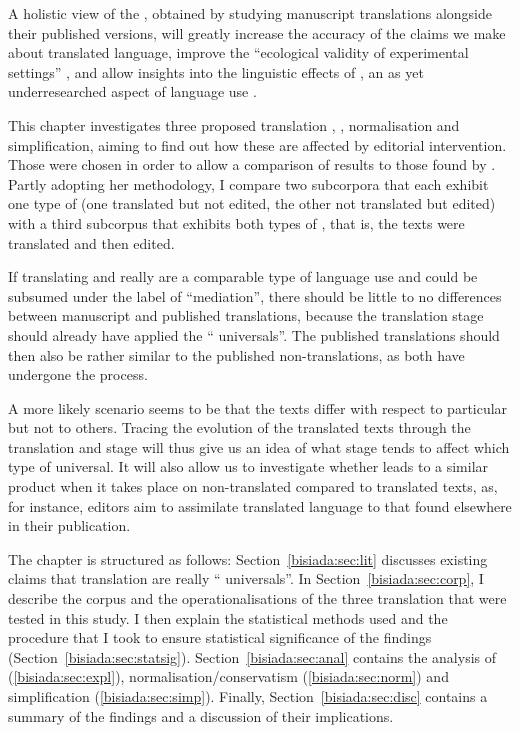 \documentclass[output=paper]{LSP/langsci}
\begin{document}
A holistic view of the , obtained by studying manuscript translations alongside their published versions, will greatly increase the accuracy of the claims we make about translated language, improve the \enquote{ecological validity of experimental settings} \parencites[179]{munoz10}[see also][110]{salobr13}, and allow insights into the linguistic effects of , an as yet underresearched aspect of language use \parencites{bisiada17tr}{bisiada17pst}.

This chapter investigates three proposed translation , , normalisation and simplification, aiming to find out how these are affected by editorial intervention. Those  were chosen in order to allow a comparison of results to those found by \textcite{kruger12}. Partly adopting her methodology, I compare two subcorpora that each exhibit one type of  (one translated but not edited, the other not translated but edited) with a third subcorpus that exhibits both types of , that is, the texts were translated and then edited.

If translating and  really are a comparable type of language use and could be subsumed under the label of \enquote{mediation}, there should be little to no differences between manuscript and published translations, because the translation stage should already have applied the \enquote{ universals}. The published translations should then also be rather similar to the published non-translations, as both have undergone the  process.

A more likely scenario seems to be that the texts differ with respect to particular  but not to others. Tracing the evolution of the translated texts through the translation and  stage will thus give us an idea of what stage tends to affect which type of universal. It will also allow us to investigate whether  leads to a similar product when it takes place on non-translated compared to translated texts, as, for instance, editors aim to assimilate translated language to that found elsewhere in their publication.

The chapter is structured as follows: Section~\ref{bisiada:sec:lit} discusses existing claims that translation  are really \enquote{ universals}. In Section~\ref{bisiada:sec:corp}, I describe the corpus and the operationalisations of the three translation  that were tested in this study. I then explain the statistical methods used and the procedure that I took to ensure statistical significance of the findings (Section~\ref{bisiada:sec:statsig}). Section~\ref{bisiada:sec:anal} contains the analysis of  (\ref{bisiada:sec:expl}), normalisation\slash conservatism (\ref{bisiada:sec:norm}) and simplification (\ref{bisiada:sec:simp}). Finally, Section~\ref{bisiada:sec:disc} contains a summary of the findings and a discussion of their implications.
\end{document}

